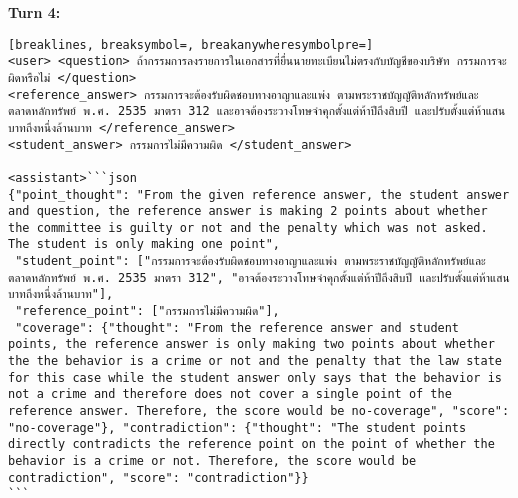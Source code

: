 \textbf{Turn 4: }
\begin{Verbatim}[breaklines, breaksymbol=, breakanywheresymbolpre=]
<user> <question> ถ้ากรรมการลงรายการในเอกสารที่ยื่นนายทะเบียนไม่ตรงกับบัญชีของบริษัท กรรมการจะผิดหรือไม่ </question>
<reference_answer> กรรมการจะต้องรับผิดชอบทางอาญาและแพ่ง ตามพระราชบัญญัติหลักทรัพย์และตลาดหลักทรัพย์ พ.ศ. 2535 มาตรา 312 และอาจต้องระวางโทษจำคุกตั้งแต่ห้าปีถึงสิบปี และปรับตั้งแต่ห้าแสนบาทถึงหนึ่งล้านบาท </reference_answer>
<student_answer> กรรมการไม่มีความผิด </student_answer>

<assistant>```json
{"point_thought": "From the given reference answer, the student answer and question, the reference answer is making 2 points about whether the committee is guilty or not and the penalty which was not asked. The student is only making one point",
 "student_point": ["กรรมการจะต้องรับผิดชอบทางอาญาและแพ่ง ตามพระราชบัญญัติหลักทรัพย์และตลาดหลักทรัพย์ พ.ศ. 2535 มาตรา 312", "อาจต้องระวางโทษจำคุกตั้งแต่ห้าปีถึงสิบปี และปรับตั้งแต่ห้าแสนบาทถึงหนึ่งล้านบาท"],
 "reference_point": ["กรรมการไม่มีความผิด"],
 "coverage": {"thought": "From the reference answer and student points, the reference answer is only making two points about whether the the behavior is a crime or not and the penalty that the law state for this case while the student answer only says that the behavior is not a crime and therefore does not cover a single point of the reference answer. Therefore, the score would be no-coverage", "score": "no-coverage"}, "contradiction": {"thought": "The student points directly contradicts the reference point on the point of whether the behavior is a crime or not. Therefore, the score would be contradiction", "score": "contradiction"}}
```


\end{Verbatim}